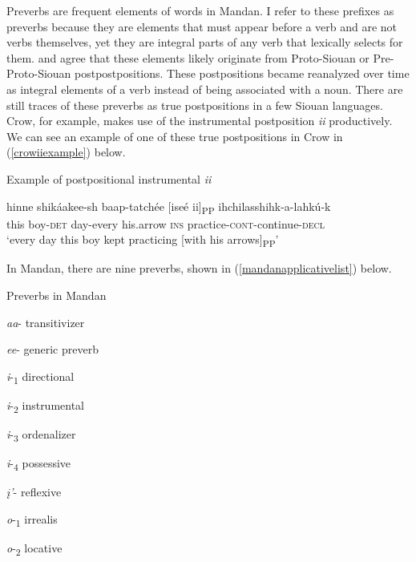 Preverbs are frequent elements of words in Mandan. I refer to these prefixes as preverbs because they are elements that must appear before a verb and are not verbs themselves, yet they are integral parts of any verb that lexically selects for them. \citet{rankinetal2003} and \citet{helmbrecht2008} agree that these elements likely originate from Proto-Siouan or Pre-Proto-Siouan postpostpositions. These postpositions became reanalyzed over time as integral elements of a verb instead of being associated with a noun. There are still traces of these preverbs as true postpositions in a few Siouan languages. Crow, for example, makes use of the instrumental postposition \textit{ii} productively. We can see an example of one of these true postpositions in Crow in (\ref{crowiiexample}) below.

\begin{exe}

\item\label{crowiiexample} Example of postpositional instrumental \textit{ii}

\gll hinne shikáakee-sh baap-tatchée \textnormal{[}iseé ii\textnormal{]\textsubscript{PP}} ihchilasshihk-a-lahkú-k\\
this boy-\textsc{det} day-every his.arrow \textsc{ins} practice-\textsc{cont}-continue-\textsc{decl}\\
\glt `every day this boy kept practicing [with his arrows]\textsubscript{PP}' \citep[377]{graczyk2007}

\end{exe}

In Mandan, there are nine preverbs, shown in (\ref{mandanapplicativelist}) below.

\begin{exe}
\item\label{mandanapplicativelist} Preverbs in Mandan

\begin{xlist}
\item \textit{aa}-                 transitivizer
\item \textit{ee}-                  generic preverb
\item \textit{i}-\textsubscript{1} directional 
\item \textit{i}-\textsubscript{2} instrumental
\item \textit{i}-\textsubscript{3} ordenalizer  
\item \textit{i}-\textsubscript{4} possessive
\item \textit{į'}-                reflexive
\item \textit{o}-\textsubscript{1} irrealis 
\item \textit{o}-\textsubscript{2} locative
           
\end{xlist}

\end{exe}

